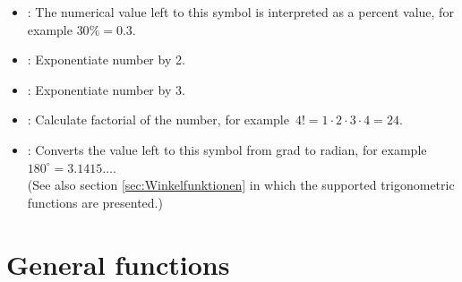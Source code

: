\begin{itemize}
\item
\cmd{\%}:
The numerical value left to this symbol is interpreted as a percent value,
for example $30\%=0.3$.

\item
{}:
Exponentiate number by 2.

\item
{}:
Exponentiate number by 3.

\item
\cmd{!}:
Calculate factorial of the number, for example\ $4!=1\cdot2\cdot3\cdot4=24$.

\item
\cmd{$^{\circ}$}:
Converts the value left to this symbol from grad to radian, for example $180^{\circ}=3.1415\ldots$.\\
(See also section \ref{sec:Winkelfunktionen} in which the supported
trigonometric functions are presented.)
\end{itemize}



\chapter{General functions}

